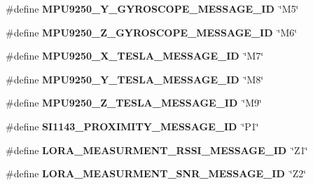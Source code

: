 \begin{DoxyCompactItemize}
\item 
\hypertarget{group___lo_ra_ga508d71f75daf489244137fc4584316b8}{}\#define {\bfseries M\+P\+U9250\+\_\+\+Y\+\_\+\+G\+Y\+R\+O\+S\+C\+O\+P\+E\+\_\+\+M\+E\+S\+S\+A\+G\+E\+\_\+\+I\+D}~\char`\"{}M5\char`\"{}\label{group___lo_ra_ga508d71f75daf489244137fc4584316b8}

\item 
\hypertarget{group___lo_ra_ga4ebe137d6e356c44fa829d87adf3abde}{}\#define {\bfseries M\+P\+U9250\+\_\+\+Z\+\_\+\+G\+Y\+R\+O\+S\+C\+O\+P\+E\+\_\+\+M\+E\+S\+S\+A\+G\+E\+\_\+\+I\+D}~\char`\"{}M6\char`\"{}\label{group___lo_ra_ga4ebe137d6e356c44fa829d87adf3abde}

\item 
\hypertarget{group___lo_ra_ga43ed5905abe9a6d3db75868d31e113f3}{}\#define {\bfseries M\+P\+U9250\+\_\+\+X\+\_\+\+T\+E\+S\+L\+A\+\_\+\+M\+E\+S\+S\+A\+G\+E\+\_\+\+I\+D}~\char`\"{}M7\char`\"{}\label{group___lo_ra_ga43ed5905abe9a6d3db75868d31e113f3}

\item 
\hypertarget{group___lo_ra_ga635403c81ab885a515a32e84e71efbef}{}\#define {\bfseries M\+P\+U9250\+\_\+\+Y\+\_\+\+T\+E\+S\+L\+A\+\_\+\+M\+E\+S\+S\+A\+G\+E\+\_\+\+I\+D}~\char`\"{}M8\char`\"{}\label{group___lo_ra_ga635403c81ab885a515a32e84e71efbef}

\item 
\hypertarget{group___lo_ra_ga08d8e42181cba932aa32d43363808029}{}\#define {\bfseries M\+P\+U9250\+\_\+\+Z\+\_\+\+T\+E\+S\+L\+A\+\_\+\+M\+E\+S\+S\+A\+G\+E\+\_\+\+I\+D}~\char`\"{}M9\char`\"{}\label{group___lo_ra_ga08d8e42181cba932aa32d43363808029}

\item 
\hypertarget{group___lo_ra_ga56eb3931ac9c877167767ef0e455e257}{}\#define {\bfseries S\+I1143\+\_\+\+P\+R\+O\+X\+I\+M\+I\+T\+Y\+\_\+\+M\+E\+S\+S\+A\+G\+E\+\_\+\+I\+D}~\char`\"{}P1\char`\"{}\label{group___lo_ra_ga56eb3931ac9c877167767ef0e455e257}

\item 
\hypertarget{group___lo_ra_gadecea778f1edf010f8487df532a809fd}{}\#define {\bfseries L\+O\+R\+A\+\_\+\+M\+E\+A\+S\+U\+R\+M\+E\+N\+T\+\_\+\+R\+S\+S\+I\+\_\+\+M\+E\+S\+S\+A\+G\+E\+\_\+\+I\+D}~\char`\"{}Z1\char`\"{}\label{group___lo_ra_gadecea778f1edf010f8487df532a809fd}

\item 
\hypertarget{group___lo_ra_ga35bdef8cefd4e6e795a0dcc5aa5d1c2b}{}\#define {\bfseries L\+O\+R\+A\+\_\+\+M\+E\+A\+S\+U\+R\+M\+E\+N\+T\+\_\+\+S\+N\+R\+\_\+\+M\+E\+S\+S\+A\+G\+E\+\_\+\+I\+D}~\char`\"{}Z2\char`\"{}\label{group___lo_ra_ga35bdef8cefd4e6e795a0dcc5aa5d1c2b}


\end{DoxyCompactItemize}
